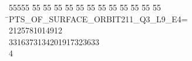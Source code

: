 %
%
\begin{tabbing}
55555 \= 55 \= 55 \= 55 \= 55 \= 55 \= 55 \= 55 \= 55 \= 55 \= 55 \= 55 \= 55 \= \>PTS\_OF\_SURFACE\_ORBIT211\_Q3\_L9\_E4=\\[0pt]
2125781014912\ \\[0pt]
3316373134201917323633\\[0pt]
4\>\end{tabbing}
